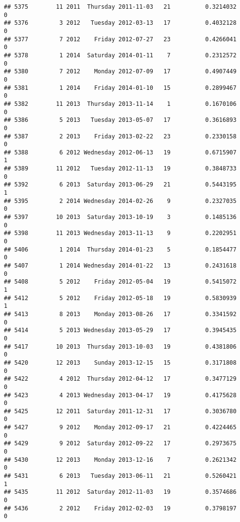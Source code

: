 \documentclass[
]{article}
\begin{document}
\begin{verbatim}
## 5375        11 2011  Thursday 2011-11-03   21          0.3214032             0
## 5376         3 2012   Tuesday 2012-03-13   17          0.4032128             0
## 5377         7 2012    Friday 2012-07-27   23          0.4266041             0
## 5378         1 2014  Saturday 2014-01-11    7          0.2312572             0
## 5380         7 2012    Monday 2012-07-09   17          0.4907449             0
## 5381         1 2014    Friday 2014-01-10   15          0.2899467             0
## 5382        11 2013  Thursday 2013-11-14    1          0.1670106             0
## 5386         5 2013   Tuesday 2013-05-07   17          0.3616893             0
## 5387         2 2013    Friday 2013-02-22   23          0.2330158             0
## 5388         6 2012 Wednesday 2012-06-13   19          0.6715907             1
## 5389        11 2012   Tuesday 2012-11-13   19          0.3848733             0
## 5392         6 2013  Saturday 2013-06-29   21          0.5443195             1
## 5395         2 2014 Wednesday 2014-02-26    9          0.2327035             0
## 5397        10 2013  Saturday 2013-10-19    3          0.1485136             0
## 5398        11 2013 Wednesday 2013-11-13    9          0.2202951             0
## 5406         1 2014  Thursday 2014-01-23    5          0.1854477             0
## 5407         1 2014 Wednesday 2014-01-22   13          0.2431618             0
## 5408         5 2012    Friday 2012-05-04   19          0.5415072             1
## 5412         5 2012    Friday 2012-05-18   19          0.5830939             1
## 5413         8 2013    Monday 2013-08-26   17          0.3341592             0
## 5414         5 2013 Wednesday 2013-05-29   17          0.3945435             0
## 5417        10 2013  Thursday 2013-10-03   19          0.4381806             0
## 5420        12 2013    Sunday 2013-12-15   15          0.3171808             0
## 5422         4 2012  Thursday 2012-04-12   17          0.3477129             0
## 5423         4 2013 Wednesday 2013-04-17   19          0.4175628             0
## 5425        12 2011  Saturday 2011-12-31   17          0.3036780             0
## 5427         9 2012    Monday 2012-09-17   21          0.4224465             0
## 5429         9 2012  Saturday 2012-09-22   17          0.2973675             0
## 5430        12 2013    Monday 2013-12-16    7          0.2621342             0
## 5431         6 2013   Tuesday 2013-06-11   21          0.5260421             1
## 5435        11 2012  Saturday 2012-11-03   19          0.3574686             0
## 5436         2 2012    Friday 2012-02-03   19          0.3798197             0

\end{verbatim}
\end{document}
